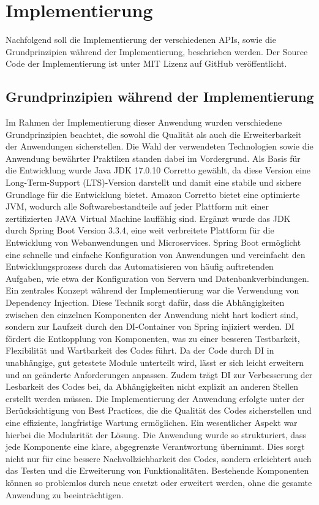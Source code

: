 \chapter{Implementierung} %
\label{sec:implementierung}
Nachfolgend soll die Implementierung der verschiedenen APIs, sowie die Grundprinzipien während der Implementierung, beschrieben werden. Der Source Code der Implementierung ist unter MIT Lizenz auf GitHub veröffentlicht. \citep{me}
\section{Grundprinzipien während der Implementierung} %
\label{sec:prinzipien}
Im Rahmen der Implementierung dieser Anwendung wurden verschiedene Grundprinzipien beachtet, die sowohl die Qualität als auch die Erweiterbarkeit der Anwendungen  sicherstellen. Die Wahl der verwendeten Technologien sowie die Anwendung bewährter Praktiken standen dabei im Vordergrund. Als Basis für die Entwicklung wurde Java JDK 17.0.10 Corretto gewählt, da diese Version eine Long-Term-Support (LTS)-Version darstellt und damit eine stabile und sichere Grundlage für die Entwicklung bietet. Amazon Corretto bietet eine optimierte JVM, wodurch alle Softwarebestandteile auf jeder Plattform mit einer zertifizierten JAVA Virtual Machine lauffähig sind. Ergänzt wurde das JDK durch Spring Boot Version 3.3.4, eine weit verbreitete Plattform für die Entwicklung von Webanwendungen und Microservices. Spring Boot ermöglicht eine schnelle und einfache Konfiguration von Anwendungen und vereinfacht den Entwicklungsprozess durch das Automatisieren von häufig auftretenden Aufgaben, wie etwa der Konfiguration von Servern und Datenbankverbindungen.
\noindent
Ein zentrales Konzept während der Implementierung war die Verwendung von Dependency Injection. Diese Technik sorgt dafür, dass die Abhängigkeiten zwischen den einzelnen Komponenten der Anwendung nicht hart kodiert sind, sondern zur Laufzeit durch den DI-Container von Spring injiziert werden. DI fördert die Entkopplung von Komponenten, was zu einer besseren Testbarkeit, Flexibilität und Wartbarkeit des Codes führt. Da der Code durch DI in unabhängige, gut getestete Module unterteilt wird, lässt er sich leicht erweitern und an geänderte Anforderungen anpassen. Zudem trägt DI zur Verbesserung der Lesbarkeit des Codes bei, da Abhängigkeiten nicht explizit an anderen Stellen erstellt werden müssen.
\noindent
Die Implementierung der Anwendung erfolgte unter der Berücksichtigung von Best Practices, die die Qualität des Codes sicherstellen und eine effiziente, langfristige Wartung ermöglichen. Ein wesentlicher Aspekt war hierbei die Modularität der Lösung. Die Anwendung wurde so strukturiert, dass jede Komponente eine klare, abgegrenzte Verantwortung übernimmt. Dies sorgt nicht nur für eine bessere Nachvollziehbarkeit des Codes, sondern erleichtert auch das Testen und die Erweiterung von Funktionalitäten. Bestehende Komponenten können so problemlos durch neue ersetzt oder erweitert werden, ohne die gesamte Anwendung zu beeinträchtigen.




